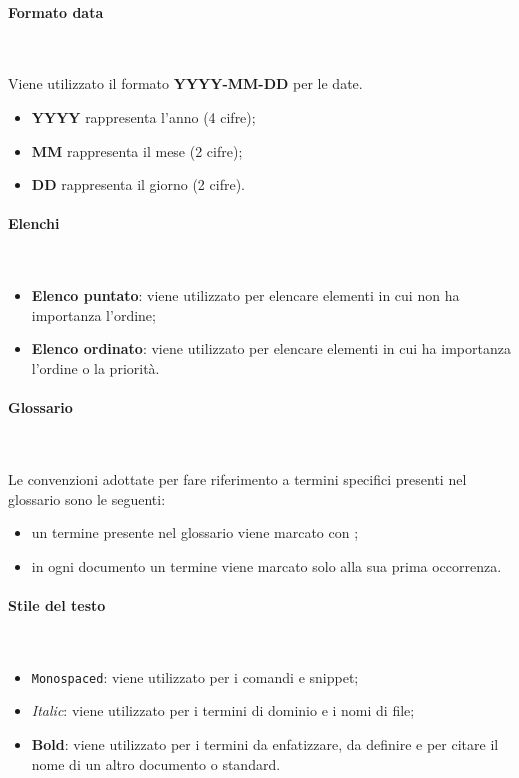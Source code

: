\paragraph{Formato data} ~

Viene utilizzato il formato \textbf{YYYY-MM-DD} per le date.
\begin{itemize}
    \item \textbf{YYYY} rappresenta l'anno (4 cifre);
    \item \textbf{MM} rappresenta il mese (2 cifre);
    \item \textbf{DD} rappresenta il giorno (2 cifre).
\end{itemize}

\paragraph{Elenchi} ~

\begin{itemize}
    \item \textbf{Elenco puntato}: viene utilizzato per elencare elementi in cui non ha importanza l'ordine;
    \item \textbf{Elenco ordinato}: viene utilizzato per elencare elementi in cui ha importanza l'ordine o la priorità.
\end{itemize}

\paragraph{Glossario} ~

Le convenzioni adottate per fare riferimento a termini specifici presenti nel glossario sono le seguenti:
\begin{itemize}
    \item un termine presente nel glossario viene marcato con \glo;
    \item in ogni documento un termine viene marcato solo alla sua prima occorrenza.
\end{itemize}

\paragraph{Stile del testo} ~

\begin{itemize}
    \item \texttt{Monospaced}: viene utilizzato per i comandi e snippet;
    \item \textit{Italic}: viene utilizzato per i termini di dominio e i nomi di file;
    \item \textbf{Bold}: viene utilizzato per i termini da enfatizzare, da definire e per citare il nome di un altro documento o standard.
\end{itemize}

